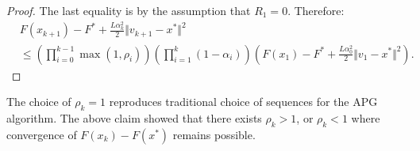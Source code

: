\documentclass[12pt]{article}
\begin{document}
\begin{proof}
        The last equality is by the assumption that $R_1 = 0$. 
        Therefore: 
        {\small
        \begin{align*}
            & 
            F(x_{k + 1}) - F^* +
            \frac{L\alpha_k^2}{2}\Vert v_{k + 1} - x^*\Vert^2
            \\
            &\le 
            \left(
                \prod_{i = 0}^{k - 1} \max(1, \rho_{i})
            \right)
            \left(
                \prod_{i = 1}^{k} \left(1  - \alpha_i\right)
            \right)
            \left(
                F(x_1) - F^* + \frac{L\alpha_0^2}{2}\Vert v_1 - x^*\Vert^2
            \right). 
        \end{align*}
        }
    \end{proof}
    \begin{remark}        
        The choice of $\rho_k = 1$ reproduces traditional choice of sequences for the APG algorithm. 
        The above claim showed that there exists $\rho_k > 1$, or $\rho_k < 1$ where convergence of $F(x_k) - F(x^*)$ remains possible. 
    \end{remark}
\end{document}
